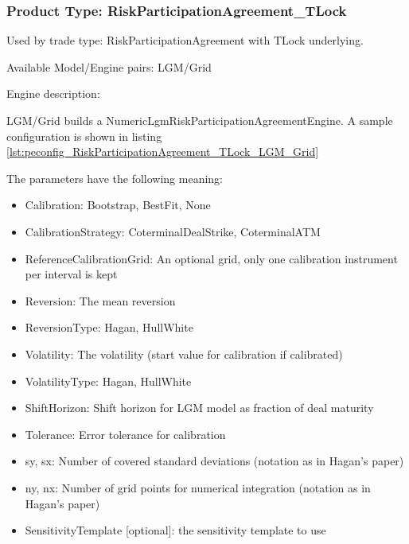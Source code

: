 \subsubsection{Product Type: RiskParticipationAgreement\_TLock}

Used by trade type: RiskParticipationAgreement with TLock underlying.

Available Model/Engine pairs: LGM/Grid

Engine description:

LGM/Grid builds a NumericLgmRiskParticipationAgreementEngine. A sample configuration is shown in listing
\ref{lst:peconfig_RiskParticipationAgreement_TLock_LGM_Grid}

The parameters have the following meaning:

\begin{itemize}
\item Calibration: Bootstrap, BestFit, None
\item CalibrationStrategy: CoterminalDealStrike, CoterminalATM
\item ReferenceCalibrationGrid: An optional grid, only one calibration instrument per interval is kept
\item Reversion: The mean reversion
\item ReversionType: Hagan, HullWhite
\item Volatility: The volatility (start value for calibration if calibrated)
\item VolatilityType: Hagan, HullWhite
\item ShiftHorizon: Shift horizon for LGM model as fraction of deal maturity
\item Tolerance: Error tolerance for calibration
\item sy, sx: Number of covered standard deviations (notation as in Hagan's paper)
\item ny, nx: Number of grid points for numerical integration (notation as in Hagan's paper)
\item SensitivityTemplate [optional]: the sensitivity template to use 
\end{itemize}

